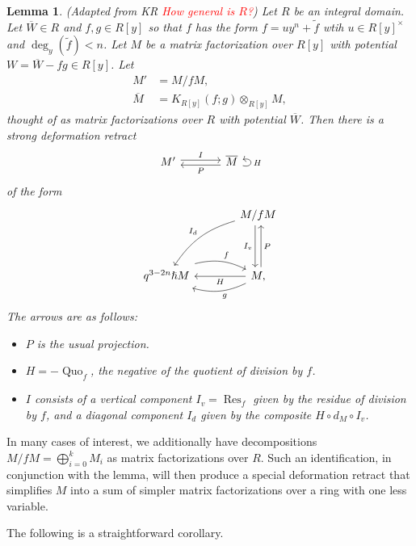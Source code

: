 \documentclass{article}
\DeclareMathOperator{\Res}{Res}
\DeclareMathOperator{\Quo}{Quo}
\newcommand{\sdr}[5]{%
  \begin{tikzcd}[column sep=large, ampersand replacement=\&]
    {#1} \arrow[r, "#3", shift left=0.5ex,] \arrow[r, leftarrow, "#4", shift right=0.5ex, swap] \& 
    {#2} \arrow[loop right, distance=1em, in=15, out=-15, "#5",swap]
  \end{tikzcd}%
}
\theoremstyle{plain} %
\newtheorem{lemma}[theorem]{Lemma}
\theoremstyle{definition} %
\theoremstyle{remark} %
\begin{document}
\begin{lemma}\label{sdrlemma}    (Adapted from KR \textcolor{red}{How general is $R$?}) Let $R$ be an integral domain. Let $\overline W\in R$ and $f,g\in R[y]$ so that $f$ has the form $f=uy^n+\tilde f$ wtih $u\in R[y]^\times$ and $\deg_y(\tilde f)<n$. Let $M$ be a matrix factorization over $R[y]$ with potential $W=\overline W-fg\in R[y]$. Let 
\begin{align*}M'&=M/fM,\\
\overline M &= K_{R[y]}(f;g)\otimes_{R[y]} M,\end{align*}
thought of as matrix factorizations over $R$ with potential $\overline W$.
Then there is a strong deformation retract
$$\sdr{M'}{\overline M}{I}{P}{H}$$
of the form
 $$\begin{tikzcd}[column sep=large, ]
    &M/fM\ar[dd, shift right=0.6ex, "I_v", swap]\ar[dd, leftarrow, shift left=0.6ex, "P"]\arrow[ddl, "I_d", bend right=20, swap]\\\\
    q^{3-2n}\hslash M\arrow[r, "f", shift left=0.5ex, bend left=20]& M\ar[l, "H"]\arrow[l, "g", shift left=0.5ex, bend left=20], 
\end{tikzcd}$$
The arrows are as follows:
\begin{itemize}
    \item $P$ is the usual projection.
    \item $H=-\Quo_f$, the negative of the quotient of division by $f$.
    \item $I$ consists of a vertical component $I_v=\Res_f$ given by the residue of division by $f$, and a diagonal component $I_d$ given by the composite $H\circ d_M\circ I_v$.
\end{itemize}
\end{lemma}


In many cases of interest, we additionally have decompositions $M/fM=\bigoplus_{i=0}^{k}M_i$ as matrix factorizations over $R$. Such an identification, in conjunction with the lemma, will then produce a special deformation retract that simplifies $M$ into a sum of simpler matrix factorizations over a ring with one less variable.

The following is a straightforward corollary.
\end{document}
